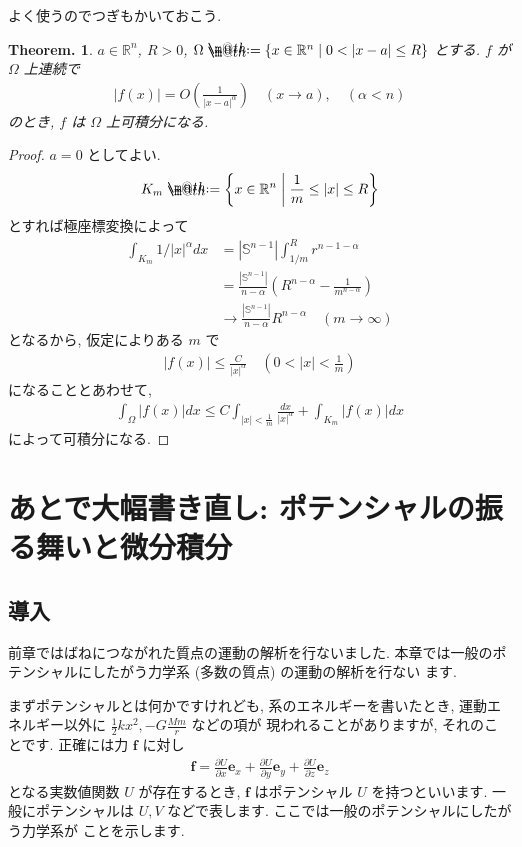 \documentclass[openany, a4paper, oneside]{jsbook}
\makeatletter
\newcommand*{\defeq}{\mathrel{\rlap{%
\raisebox{0.3ex}{$\m@th\cdot$}}%
\raisebox{-0.3ex}{$\m@th\cdot$}}%
=}
\theoremstyle{break}
\newtheorem{thm}{Theorem.}[section]
\theoremstyle{breakdefn}
\newcommand{\abs}[1]{\left|#1\right|}
\newcommand{\rbk}[1]{\left (#1\right)}
\newcommand{\relmiddle}[1]{\mathrel{}\middle#1\mathrel{}}
\newcommand{\set}[2]{\left\{#1 \relmiddle| #2\right\}}
\newcommand{\bbR}{\mathbb{R}}
\newcommand{\bbRn}{\mathbb{R}^n}
\makeatother
\begin{document}
よく使うのでつぎもかいておこう.
\begin{thm}
$a \in \mathbb{R}^n$, $R > 0$, $\Omega \defeq \set{x \in \bbRn}{0 < \abs{x - a} \le R}$ とする.
$f$ が $\Omega$ 上連続で
\begin{align}
 \abs{f(x)}
 =
 O \rbk{\frac{1}{\abs{x - a}^{\alpha}}} \quad (x \to a), \quad (\alpha < n)
\end{align}
のとき, $f$ は $\Omega$ 上可積分になる.
\end{thm}
\begin{proof}
$a=0$ としてよい.
\begin{align}
 K_m
 \defeq
 \set{x \in \bbR^n}{\frac{1}{m} \le \abs{x} \le R}
\end{align}
とすれば極座標変換によって
\begin{align}
 \int_{K_m} 1/{|x|^{\alpha}} dx
 &=
 \abs{\mathbb{S}^{n-1}} \int_{1/m}^R r^{n-1-\alpha} \\
 &=
 \frac{\abs{\mathbb{S}^{n-1}}}{n - \alpha} \rbk{R^{n-\alpha} - \frac{1}{m^{n-\alpha}}} \\
 &\to
 \frac{\abs{\mathbb{S}^{n-1}}}{n-\alpha} R^{n-\alpha} \quad (m \to \infty)
\end{align}
となるから, 仮定によりある $m$ で
\begin{align}
 \abs{f(x)}
 \le
 \frac{C}{\abs{x}^{\alpha}} \quad \rbk{0 < \abs{x} < \frac{1}{m}}
\end{align}
になることとあわせて,
\begin{align}
 \int_{\Omega} \abs{f(x)} dx
 \le
 C \int_{\abs{x} < \frac{1}{m}} \frac{dx}{\abs{x}^{\alpha}} + \int_{K_m} \abs{f(x)} dx
\end{align}
によって可積分になる.
\end{proof}
\chapter{あとで大幅書き直し: ポテンシャルの振る舞いと微分積分}

\section{導入}


前章ではばねにつながれた質点の運動の解析を行ないました.
本章では一般のポテンシャルにしたがう力学系 (多数の質点) の運動の解析を行ない
ます.

まずポテンシャルとは何かですけれども,
系のエネルギーを書いたとき, 運動エネルギー以外に
$\frac{1}{2}kx^2,-G\frac{Mm}{r}$ などの項が
現われることがありますが, それのことです.
正確には力 $\bm{f}$ に対し
\begin{align}
\bm{f} =
\frac{ \partial U }{\partial x}\bm{e}_{x} + \frac{ \partial U}{\partial y}\bm{e}_{y} +
\frac{ \partial U}{\partial z}\bm{e}_{z}
\end{align}
となる実数値関数 $U$ が存在するとき,  $\bm{f}$ はポテンシャル $U$ を持つといいます.
一般にポテンシャルは $U,V$ などで表します.
ここでは一般のポテンシャルにしたがう力学系が
ことを示します.
\end{document}
